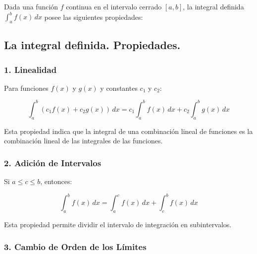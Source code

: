 \begin{multicols}{2}
\begin{center}
\end{center}
\end{multicols}

Dada una función \( f \) continua en el intervalo cerrado \([a, b]\), la integral definida \(\int_{a}^{b} f(x) \, dx\) posee las siguientes propiedades:

\subsection{La integral definida. Propiedades.}

\subsubsection{1. Linealidad}

Para funciones \( f(x) \) y \( g(x) \) y constantes \( c_1 \) y \( c_2 \):

\[
\int_{a}^{b} \left(c_1 f(x) + c_2 g(x)\right) \, dx = c_1 \int_{a}^{b} f(x) \, dx + c_2 \int_{a}^{b} g(x) \, dx
\]

Esta propiedad indica que la integral de una combinación lineal de funciones es la combinación lineal de las integrales de las funciones.

\subsubsection{2. Adición de Intervalos}

Si \( a \leq c \leq b \), entonces:

\[
\int_{a}^{b} f(x) \, dx = \int_{a}^{c} f(x) \, dx + \int_{c}^{b} f(x) \, dx
\]

Esta propiedad permite dividir el intervalo de integración en subintervalos.

\subsubsection{3. Cambio de Orden de los Límites}

